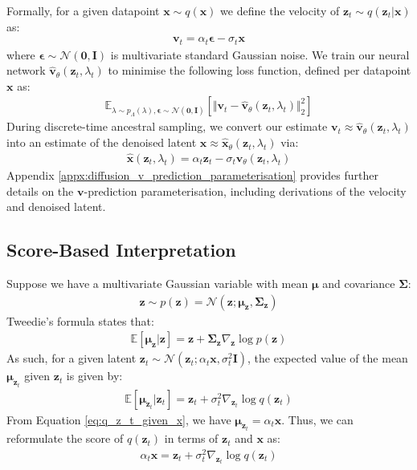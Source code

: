 \documentclass[ oneside,%
                    author={George Herbert},
                    degree={MSci},
                     title={Video Diffusion Models for Climate Simulations},
                  subtitle={}]{dissertation}
\begin{document}
Formally, for a given datapoint $\mathbf{x}\sim q(\mathbf{x})$  we define the velocity of $\mathbf{z}_t\sim q(\mathbf{z}_t|\mathbf{x})$ as:
\begin{align}
      \mathbf{v}_t=\alpha_t\boldsymbol\epsilon - \sigma_t\mathbf{x}
\end{align}
where $\boldsymbol\epsilon\sim\mathcal{N}(\mathbf{0}, \mathbf{I})$ is multivariate standard Gaussian noise. We train our neural network $\hat{\mathbf{v}}_\theta(\mathbf{z}_t,\lambda_t)$ to minimise the following loss function, defined per datapoint $\mathbf{x}$ as:
\begin{align}
      \mathbb{E}_{\lambda\sim p_\Lambda(\lambda),\boldsymbol\epsilon\sim\mathcal{N}(\mathbf{0},\mathbf{I})}\left[\Vert\mathbf{v}_t-\hat{\mathbf{v}}_\theta(\mathbf{z}_t, \lambda_t)\Vert_2^2\right]\label{eq:v_parameterisation_loss}
\end{align}
During discrete-time ancestral sampling, we convert our estimate $\mathbf{v}_t\approx\hat{\mathbf{v}}_\theta(\mathbf{z}_t,\lambda_t)$ into an estimate of the denoised latent $\mathbf{x}\approx\hat{\mathbf{x}}_\theta(\mathbf{z}_t,\lambda_t)$ via:
\begin{align}
      \hat{\mathbf{x}}(\mathbf{z}_t,\lambda_t)=\alpha_t\mathbf{z}_t-\sigma_t\hat{\mathbf{v}}_\theta(\mathbf{z}_t,\lambda_t)
\end{align}
Appendix \ref{appx:diffusion_v_prediction_parameterisation} provides further details on the $\mathbf{v}$-prediction parameterisation, including derivations of the velocity and denoised latent.

\subsection{Score-Based Interpretation}

Suppose we have a multivariate Gaussian variable with mean $\boldsymbol\mu$ and covariance $\boldsymbol\Sigma$:
\begin{align}
      \mathbf{z}\sim p(\mathbf{z})=\mathcal{N}(\mathbf{z}; \boldsymbol\mu_{\mathbf{z}}, \boldsymbol\Sigma_{\mathbf{z}})
\end{align}
Tweedie's formula states that:
\begin{align}
\mathbb{E}\left[\boldsymbol\mu_{\mathbf{z}}|\mathbf{z}\right]=\mathbf{z}+\boldsymbol\Sigma_{\mathbf{z}} \nabla_{\mathbf{z}}\log p(\mathbf{z})
\end{align}
As such, for a given latent $\mathbf{z}_t\sim\mathcal{N}(\mathbf{z}_t; \alpha_t\mathbf{x}, \sigma_t^2\mathbf{I})$, the expected value of the mean $\boldsymbol{\mu}_{\mathbf{z}_t}$ given $\mathbf{z}_t$ is given by:
\begin{align}
      \mathbb{E}\left[\boldsymbol\mu_{\mathbf{z}_t}|\mathbf{z}_t\right]=\mathbf{z}_t+\sigma_t^2\nabla_{\mathbf{z}_t}\log q(\mathbf{z}_t)
\end{align}
From Equation \ref{eq:q_z_t_given_x}, we have $\boldsymbol\mu_{\mathbf{z}_t}=\alpha_t\mathbf{x}$. Thus, we can reformulate the score of $q(\mathbf{z}_t)$ in terms of $\mathbf{z}_t$ and $\mathbf{x}$ as:
\begin{align}
      \alpha_t\mathbf{x}=\mathbf{z}_t + \sigma_t^2\nabla_{\mathbf{z}_t}\log q(\mathbf{z}_t)
\end{align}
\end{document}
